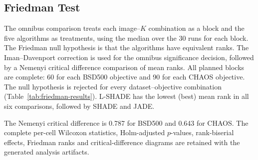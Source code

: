 \documentclass[review,authoryear]{elsarticle}
\begin{document}
\subsection{Friedman Test}

The omnibus comparison treats each image--$K$ combination as a
block and the five algorithms as treatments, using the median over the
30 runs for each block. The Friedman null hypothesis is that the
algorithms have equivalent ranks. The Iman--Davenport correction is used
for the omnibus significance decision, followed by a Nemenyi critical
difference comparison of mean ranks. All planned blocks are complete:
60 for each BSD500 objective and 90 for each CHAOS objective. The null
hypothesis is rejected for every dataset--objective combination
(Table~\ref{tab:friedman-results}). L-SHADE has the lowest (best) mean
rank in all six comparisons, followed by SHADE and JADE.


\begin{table}[H]
\caption{Friedman tests with Iman--Davenport correction. Rank order is
from best (lowest mean rank) to worst.}
\label{tab:friedman-results}
\centering
\small
{}

\end{table}

The Nemenyi critical difference is 0.787 for BSD500 and 0.643 for
CHAOS. The complete per-cell Wilcoxon statistics, Holm-adjusted
$p$-values, rank-biserial effects, Friedman ranks and critical-difference
diagrams are retained with the generated analysis artifacts.
\end{document}
